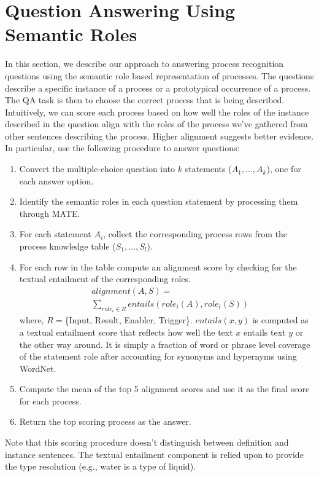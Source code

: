 \section{Question Answering Using Semantic Roles}
\label{sec:qa}
In this section, we describe our approach to answering process recognition questions using the semantic role based representation of processes.
The questions describe a specific instance of a process or a prototypical occurrence of a process. 
The QA task is then to choose the correct process that is being described. 
Intuitively, we can score each process based on how well the roles of the instance described in the question align with the roles of the process we've gathered from other sentences describing the process. 
Higher alignment suggests better evidence. 
In particular, use the following procedure to answer questions:\\
\begin{enumerate}
\item Convert the multiple-choice question into $k$ statements (${A_1, ..., A_k}$), one for each answer option. 
\item Identify the semantic roles in each question statement by processing them through MATE. 
\item For each statement $A_i$, collect the corresponding process rows from the process knowledge table ($S_1, ..., S_l$). 
\item For each row in the table compute an alignment score by checking for the textual entailment of the corresponding roles. 
\begin{align*}
&alignment(A, S) = \\
& \sum_{role_i \in R} entails(role_i(A), role_i(S))
\end{align*}
where, $R =$\{Input, Result, Enabler, Trigger\}. $entails(x, y)$ is computed as a textual entailment score that reflects how well the text $x$ entails text $y$ or the other way around. It is simply a fraction of word or phrase level coverage of the statement role after accounting for synonyms and hypernyms using WordNet. 
\item Compute the mean of the top 5 alignment scores and use it as the final score for each process. 
\item Return the top scoring process as the answer.
\end{enumerate}

Note that this scoring procedure doesn't distinguish between definition and instance sentences. 
The textual entailment component is relied upon to provide the type resolution (e.g., water is a type of liquid).



